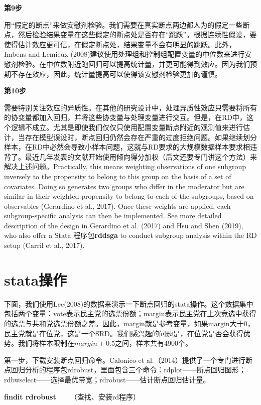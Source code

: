 \documentclass[cn,12pt,math=newtx,citestyle=gb7714-2015,bibstyle=gb7714-2015]{elegantbook}
\begin{document}
	\textbf{第9步}
	
	用“假定的断点”来做安慰剂检验。我们需要在真实断点两边都人为的假定一些断点，然后检验结果变量在这些假定的断点处是否存在“跳跃”。根据连续性假设，要使得估计效应更可信，在假定断点处，结果变量不会有明显的跳跃。此外，Imbens and Lemieux (2008)建议使用处理组和控制组配置变量的中位数来进行安慰剂检验。在中位数附近跑回归可以提高统计量，并更可能得到效应。因为我们预期不存在效应，因此，统计量提高可以使得该安慰剂检验更加的谨慎。
	
	\textbf{第10步}	
	
	需要特别关注效应的异质性。在其他的研究设计中，处理异质性效应只需要将所有的协变量都加入回归，并将这些协变量与处理变量进行交互。但是，在RD中，这个逻辑不成立。尤其是即使我们仅仅只使用配置变量断点附近的观测值来进行估计，当存在模型误设时，断点回归仍然会存在严重的过度拒绝问题。如果继续划分样本，在RD中必然会导致小样本问题，这就与RD要求的大规模数据样本要求相违背了。最近几年发表的文献开始使用倾向得分加权（后文还要专门讲这个方法）来解决上述问题。Practically, this means weighting observations of one subgroup inversely to the propensity to belong to this group on the basis of a set of covariates. Doing so generates two groups who differ in the moderator but are similar in their weighted propensity to belong to each of the subgroups, based on observables (Gerardino et al., 2017). Once these weights are applied, each subgroup-specific analysis can then be implemented. See more detailed description of the design in Gerardino et al. (2017) and Hsu and Shen (2019), who also offer a Stata 程序包\textbf{rddsga} to conduct subgroup analysis within the RD setup (Carril et al., 2017).
	
	

	
	\section{stata操作}
	
	下面，我们使用Lee(2008)的数据来演示一下断点回归的stata操作。这个数据集中包括两个变量：vote表示民主党的选票份额；margin表示民主党在上次竞选中获得的选票与共和党选票份额之差。因此，margin就是参考变量，如果margin大于0，民主党就是在位党，这是一个SRD。我们感兴趣的问题是，在位党是否会获得优势。我们将样本限制在$margin\pm0.5$之间，样本共有4900个。
	
	第一步，下载安装断点回归命令。Calonico et al.（2014）提供了一个专门进行断点回归分析的程序包rdrobust，里面包含三个命令：rdplot——断点回归图形；rdbwselect——选择最优带宽；rdrobust——估计断点回归估计量。
	
	\textbf{findit rdrobust}~~~~（查找、安装rd程序）
	
\end{document}
